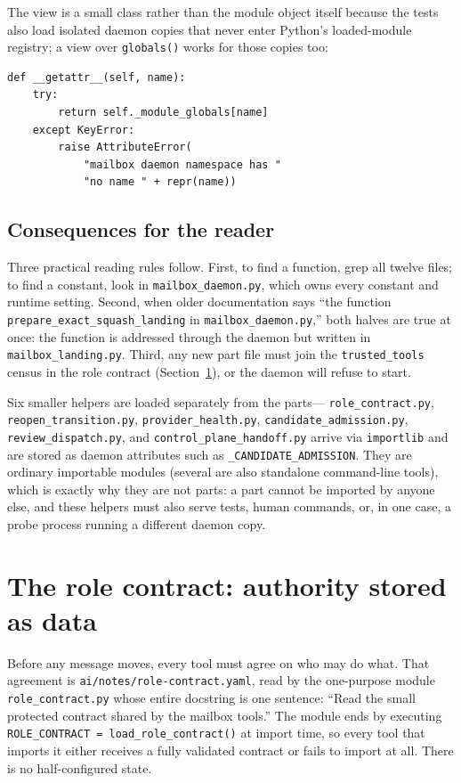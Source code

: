 \documentclass[10pt,aps,prd,twocolumn,nofootinbib]{revtex4-2}
\newcommand{\code}[1]{\texttt{#1}}
\newcommand{\file}[1]{\texttt{#1}}
\begin{document}
The view is a small class rather than the module object itself
because the tests also load isolated daemon copies that never enter
Python's loaded-module registry; a view over
\code{globals()} works for those copies too:

\begin{verbatim}
def __getattr__(self, name):
    try:
        return self._module_globals[name]
    except KeyError:
        raise AttributeError(
            "mailbox daemon namespace has "
            "no name " + repr(name))
\end{verbatim}

\subsection{Consequences for the reader}

Three practical reading rules follow.  First, to find a function,
grep all twelve files; to find a constant, look in
\file{mailbox\_daemon.py}, which owns every constant and runtime
setting.  Second, when older documentation says ``the function
\code{prepare\_exact\_squash\_landing} in \file{mailbox\_daemon.py},''
both halves are true at once: the function is addressed through the
daemon but written in \file{mailbox\_landing.py}.  Third, any new part
file must join the \code{trusted\_tools} census in the role contract
(Section~\ref{sec:role-contract}), or the daemon will refuse to start.

Six smaller helpers are loaded separately from the parts---
\file{role\_contract.py}, \file{reopen\_transition.py},
\file{provider\_health.py}, \file{candidate\_admission.py},
\file{review\_dispatch.py}, and \file{control\_plane\_handoff.py}
arrive via \code{importlib} and are stored as daemon attributes such
as \code{\_CANDIDATE\_ADMISSION}.  They are ordinary importable
modules (several are also standalone command-line tools), which is
exactly why they are not parts: a part cannot be imported by anyone
else, and these helpers must also serve tests, human commands, or, in
one case, a probe process running a different daemon copy.

\section{The role contract: authority stored as data}
\label{sec:role-contract}

Before any message moves, every tool must agree on who may do what.
That agreement is \file{ai/notes/role-contract.yaml}, read by the
one-purpose module \file{role\_contract.py} whose entire docstring is
one sentence: ``Read the small protected contract shared by the mailbox
tools.''  The module ends by executing
\code{ROLE\_CONTRACT = load\_role\_contract()} at import time, so every
tool that imports it either receives a fully validated contract or
fails to import at all.  There is no half-configured state.
\end{document}
